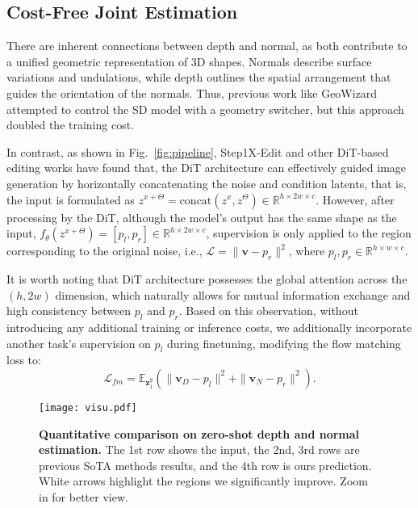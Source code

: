 \documentclass{article} %
\begin{document}
\subsection{Cost-Free Joint Estimation }
\label{sec:joint}
There are inherent connections between depth and normal, as both contribute to a unified geometric representation of 3D shapes. Normals describe surface variations and undulations, while depth outlines the spatial arrangement that guides the orientation of the normals. Thus, previous work like GeoWizard~\citep{geowizard} attempted to control the SD model with a geometry switcher, but this approach doubled the training cost.

In contrast, as shown in Fig.~\ref{fig:pipeline}, Step1X-Edit and other DiT-based editing works have found that, the DiT architecture can effectively guided image generation by horizontally concatenating the noise and condition latents, that is, the input is formulated as $z^{x+\Theta}=\text{concat}(z^x, z^\Theta) \in \mathbb{R}^{h \times 2w \times c}$. However, after processing by the DiT, although the model's output has the same shape as the input, $f_\theta(z^{x+\Theta}) = [p_l, p_r] \in \mathbb{R}^{h \times 2w \times c}$, supervision is only applied to the region corresponding to the original noise, i.e., $\mathcal{L} = \|\mathbf{v} - p_r\|^2$, where $p_l, p_r \in \mathbb{R}^{h \times w \times c}$.

It is worth noting that DiT architecture possesses the global attention across the $(h, 2w)$ dimension, which naturally allows for mutual information exchange and high consistency between $p_l$ and $p_r$. Based on this observation, without introducing any additional training or inference costs, we additionally incorporate another task's supervision on $p_l$ during finetuning, modifying the flow matching loss to:
\begin{equation}
  \label{eq:loss_joint}
      \mathcal{L}_{fm} =  \mathbb{E}_{\mathbf{z}^{y}_1}( \|\mathbf{v}_D - p_l \|^2 +  \|\mathbf{v}_N - p_r \|^2).
\end{equation}
\begin{figure}[!t]
\vspace{-0.5em}
  \texttt{[image: visu.pdf]}
  \vspace{-2em}
  \caption{\textbf{Quantitative comparison on zero-shot depth and normal estimation.} The 1st row shows the input, the 2nd, 3rd rows are previous SoTA methods results, and the 4th row is ours prediction. White arrows highlight the regions we significantly improve. Zoom in for better view.
  }
  \label{fig:visual}
  \vspace{-1em}
\end{figure}
\vspace{-1em}
\end{document}
